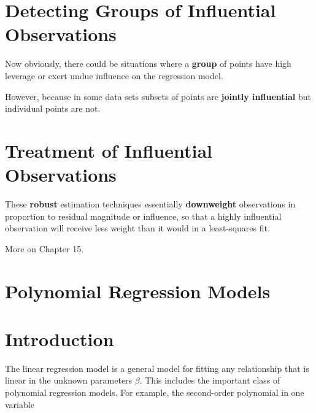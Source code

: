 \documentclass[12pt]{article}
\begin{document}
\section{Detecting Groups of Influential Observations}

Now obviously, there could be situations where a \textbf{group} of points have high leverage or exert undue influence on the regression model. 

However, because in some data sets subsets of points are \textbf{jointly influential} but individual points are not.


\section{Treatment of Influential Observations}

These \textbf{robust} estimation techniques essentially \textbf{downweight} observations in proportion to residual magnitude or influence, so that a highly influential observation will receive less weight than it would in a least-squares fit. 

More on Chapter 15.



\pagebreak

\section*{Polynomial Regression Models}

\setcounter{section}{0}
\bigskip

\section{Introduction}


The linear regression model is a general model for fitting any relationship that is linear in the unknown parameters $\beta$. This includes the important class of polynomial regression models. For example, the second-order polynomial in one variable
\end{document}
